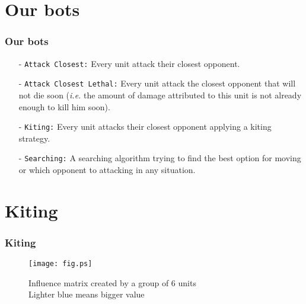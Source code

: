 \documentclass{beamer}
\begin{document}
\section{Our bots}

\begin{frame}
\frametitle{Our bots}
\begin{itemize}
\item[-] \texttt{Attack Closest:} Every unit attack their closest opponent.
\item[-] \texttt{Attack Closest Lethal:} Every unit attack the closest opponent that will not die soon (\emph{i.e.} the amount of damage attributed to this unit is not already enough to kill him soon).
\item[-] \texttt{Kiting:} Every unit attacks their closest opponent applying a kiting strategy.
\item[-] \texttt{Searching:} A searching algorithm trying to find the best option for moving or which opponent to attacking in any situation.

\end{itemize}
\end{frame}

\section{Kiting}


\begin{frame}
\frametitle{Kiting}
\begin{center}
    \begin{figure}
        \centering
        \texttt{[image: fig.ps]}
        \caption{Influence matrix created by a group of 6 units \\ 
        Lighter blue means bigger value}
        \label{influenceMatrix}
    \end{figure}
\end{center}
\end{frame}
\end{document}

